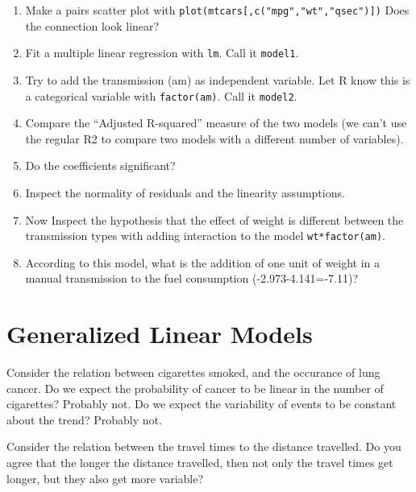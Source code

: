 \documentclass[]{book}
\providecommand{\tightlist}{%
  \setlength{\itemsep}{0pt}\setlength{\parskip}{0pt}}
\theoremstyle{definition}
\theoremstyle{definition}
\theoremstyle{definition}
\theoremstyle{remark}
\let\BeginKnitrBlock\begin \let\EndKnitrBlock\end
\begin{document}
\begin{enumerate}
  \begin{enumerate}
  \def\labelenumii{\arabic{enumii}.}
  \tightlist
  \item
    Make a pairs scatter plot with \texttt{plot(mtcars{[},c("mpg","wt","qsec"){]})}
    Does the connection look linear?
  \item
    Fit a multiple linear regression with \texttt{lm}. Call it \texttt{model1}.
  \item
    Try to add the transmission (am) as independent variable. Let R know this is a categorical variable with \texttt{factor(am)}. Call it \texttt{model2}.
  \item
    Compare the ``Adjusted R-squared'' measure of the two models (we can't use the regular R2 to compare two models with a different number of variables).
  \item
    Do the coefficients significant?
  \item
    Inspect the normality of residuals and the linearity assumptions.
  \item
    Now Inspect the hypothesis that the effect of weight is different between the transmission types with adding interaction to the model \texttt{wt*factor(am)}.
  \item
    According to this model, what is the addition of one unit of weight in a manual transmission to the fuel consumption (-2.973-4.141=-7.11)?
  \end{enumerate}
\end{enumerate}

\hypertarget{glm}{%
\chapter{Generalized Linear Models}\label{glm}}

\BeginKnitrBlock{example}
\protect\hypertarget{exm:cigarettes}{}{\label{exm:cigarettes} }Consider the relation between cigarettes smoked, and the occurance of lung cancer.
Do we expect the probability of cancer to be linear in the number of cigarettes? Probably not.
Do we expect the variability of events to be constant about the trend? Probably not.
\EndKnitrBlock{example}

\BeginKnitrBlock{example}
\protect\hypertarget{exm:cars}{}{\label{exm:cars} }Consider the relation between the travel times to the distance travelled.
Do you agree that the longer the distance travelled, then not only the travel times get longer, but they also get more variable?
\EndKnitrBlock{example}
\end{document}
